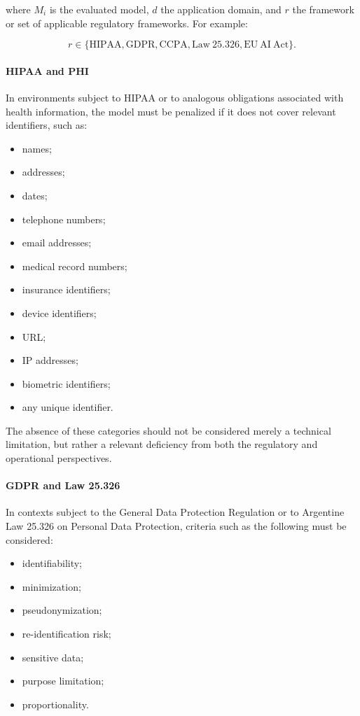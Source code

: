 \documentclass[11pt,a4paper]{article}
\begin{document}
where $M_i$ is the evaluated model, $d$ the application domain, and $r$ the framework or set of applicable regulatory frameworks. For example:

\begin{equation}
    r\in\{\mathrm{HIPAA},\mathrm{GDPR},\mathrm{CCPA},\mathrm{Law\ 25.326},\mathrm{EU\ AI\ Act}\}.
\end{equation}

\paragraph{HIPAA and PHI}

In environments subject to HIPAA or to analogous obligations associated with health information, the model must be penalized if it does not cover relevant identifiers, such as:

\begin{itemize}
    \item names;
    \item addresses;
    \item dates;
    \item telephone numbers;
    \item email addresses;
    \item medical record numbers;
    \item insurance identifiers;
    \item device identifiers;
    \item URL;
    \item IP addresses;
    \item biometric identifiers;
    \item any unique identifier.
\end{itemize}

The absence of these categories should not be considered merely a technical limitation, but rather a relevant deficiency from both the regulatory and operational perspectives.

\paragraph{GDPR and Law 25.326}

In contexts subject to the General Data Protection Regulation or to Argentine Law 25.326 on Personal Data Protection, criteria such as the following must be considered:

\begin{itemize}
    \item identifiability;
    \item minimization;
    \item pseudonymization;
    \item re-identification risk;
    \item sensitive data;
    \item purpose limitation;
    \item proportionality.
\end{itemize}
\end{document}
